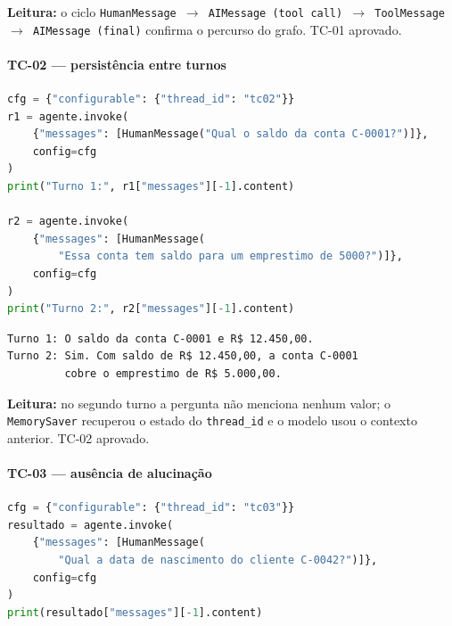 \noindent\textbf{Leitura:} o ciclo
\texttt{HumanMessage\,$\to$\,AIMessage (tool call)\,$\to$\,ToolMessage\,%
$\to$\,AIMessage (final)} confirma o percurso do grafo. TC-01 aprovado.

\paragraph{TC-02 --- persist\^encia entre turnos}

\begin{lstlisting}[language=Python,
      caption={TC-02 --- persist\^encia de contexto entre turnos.},
      label={lst:cap3_tc02_codigo}]
cfg = {"configurable": {"thread_id": "tc02"}}
r1 = agente.invoke(
    {"messages": [HumanMessage("Qual o saldo da conta C-0001?")]},
    config=cfg
)
print("Turno 1:", r1["messages"][-1].content)

r2 = agente.invoke(
    {"messages": [HumanMessage(
        "Essa conta tem saldo para um emprestimo de 5000?")]},
    config=cfg
)
print("Turno 2:", r2["messages"][-1].content)
\end{lstlisting}

\begin{lstlisting}[language=bash,
      caption={TC-02 --- agente recorda contexto sem repassa-lo explicitamente.},
      label={lst:cap3_tc02_saida}]
Turno 1: O saldo da conta C-0001 e R$ 12.450,00.
Turno 2: Sim. Com saldo de R$ 12.450,00, a conta C-0001
         cobre o emprestimo de R$ 5.000,00.
\end{lstlisting}

\noindent\textbf{Leitura:} no segundo turno a pergunta n\~ao menciona
nenhum valor; o \texttt{MemorySaver} recuperou o estado do
\texttt{thread\_id} e o modelo usou o contexto anterior. TC-02 aprovado.

\paragraph{TC-03 --- aus\^encia de alucina\c{c}\~ao}

\begin{lstlisting}[language=Python,
      caption={TC-03 --- pergunta sobre dado indispon\'ivel nas ferramentas.},
      label={lst:cap3_tc03_codigo}]
cfg = {"configurable": {"thread_id": "tc03"}}
resultado = agente.invoke(
    {"messages": [HumanMessage(
        "Qual a data de nascimento do cliente C-0042?")]},
    config=cfg
)
print(resultado["messages"][-1].content)
\end{lstlisting}

